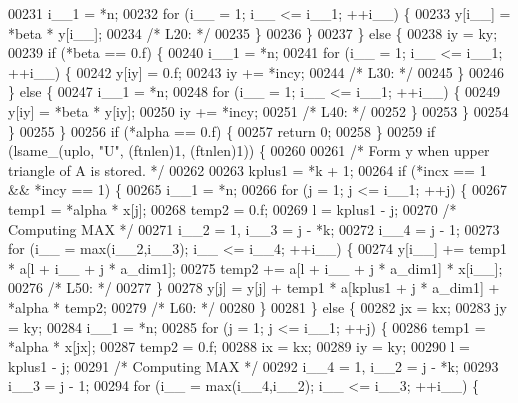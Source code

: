 \begin{DoxyCode}
00231         i\_\_1 = *n;
00232         \textcolor{keywordflow}{for} (i\_\_ = 1; i\_\_ <= i\_\_1; ++i\_\_) \{
00233             y[i\_\_] = *beta * y[i\_\_];
00234 \textcolor{comment}{/* L20: */}
00235         \}
00236         \}
00237     \} \textcolor{keywordflow}{else} \{
00238         iy = ky;
00239         \textcolor{keywordflow}{if} (*beta == 0.f) \{
00240         i\_\_1 = *n;
00241         \textcolor{keywordflow}{for} (i\_\_ = 1; i\_\_ <= i\_\_1; ++i\_\_) \{
00242             y[iy] = 0.f;
00243             iy += *incy;
00244 \textcolor{comment}{/* L30: */}
00245         \}
00246         \} \textcolor{keywordflow}{else} \{
00247         i\_\_1 = *n;
00248         \textcolor{keywordflow}{for} (i\_\_ = 1; i\_\_ <= i\_\_1; ++i\_\_) \{
00249             y[iy] = *beta * y[iy];
00250             iy += *incy;
00251 \textcolor{comment}{/* L40: */}
00252         \}
00253         \}
00254     \}
00255     \}
00256     \textcolor{keywordflow}{if} (*alpha == 0.f) \{
00257     \textcolor{keywordflow}{return} 0;
00258     \}
00259     \textcolor{keywordflow}{if} (lsame\_(uplo, \textcolor{stringliteral}{"U"}, (ftnlen)1, (ftnlen)1)) \{
00260 
00261 \textcolor{comment}{/*        Form  y  when upper triangle of A is stored. */}
00262 
00263     kplus1 = *k + 1;
00264     \textcolor{keywordflow}{if} (*incx == 1 && *incy == 1) \{
00265         i\_\_1 = *n;
00266         \textcolor{keywordflow}{for} (j = 1; j <= i\_\_1; ++j) \{
00267         temp1 = *alpha * x[j];
00268         temp2 = 0.f;
00269         l = kplus1 - j;
00270 \textcolor{comment}{/* Computing MAX */}
00271         i\_\_2 = 1, i\_\_3 = j - *k;
00272         i\_\_4 = j - 1;
00273         \textcolor{keywordflow}{for} (i\_\_ = max(i\_\_2,i\_\_3); i\_\_ <= i\_\_4; ++i\_\_) \{
00274             y[i\_\_] += temp1 * a[l + i\_\_ + j * a\_dim1];
00275             temp2 += a[l + i\_\_ + j * a\_dim1] * x[i\_\_];
00276 \textcolor{comment}{/* L50: */}
00277         \}
00278         y[j] = y[j] + temp1 * a[kplus1 + j * a\_dim1] + *alpha * temp2;
00279 \textcolor{comment}{/* L60: */}
00280         \}
00281     \} \textcolor{keywordflow}{else} \{
00282         jx = kx;
00283         jy = ky;
00284         i\_\_1 = *n;
00285         \textcolor{keywordflow}{for} (j = 1; j <= i\_\_1; ++j) \{
00286         temp1 = *alpha * x[jx];
00287         temp2 = 0.f;
00288         ix = kx;
00289         iy = ky;
00290         l = kplus1 - j;
00291 \textcolor{comment}{/* Computing MAX */}
00292         i\_\_4 = 1, i\_\_2 = j - *k;
00293         i\_\_3 = j - 1;
00294         \textcolor{keywordflow}{for} (i\_\_ = max(i\_\_4,i\_\_2); i\_\_ <= i\_\_3; ++i\_\_) \{

\end{DoxyCode}
